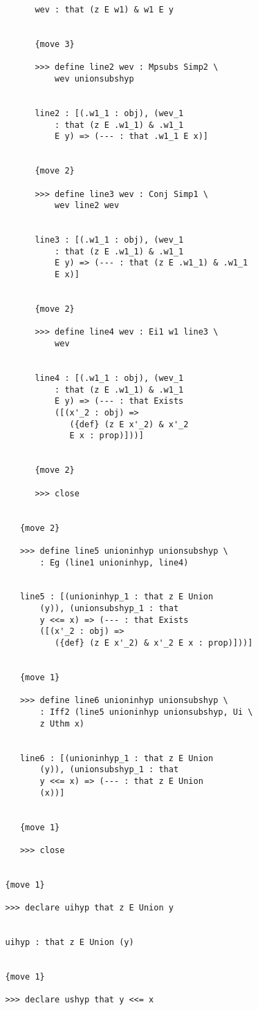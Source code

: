 \documentclass[12pt]{article}
\begin{document}
\begin{verbatim}
         wev : that (z E w1) & w1 E y


         {move 3}

         >>> define line2 wev : Mpsubs Simp2 \
             wev unionsubshyp


         line2 : [(.w1_1 : obj), (wev_1 
             : that (z E .w1_1) & .w1_1 
             E y) => (--- : that .w1_1 E x)]


         {move 2}

         >>> define line3 wev : Conj Simp1 \
             wev line2 wev


         line3 : [(.w1_1 : obj), (wev_1 
             : that (z E .w1_1) & .w1_1 
             E y) => (--- : that (z E .w1_1) & .w1_1 
             E x)]


         {move 2}

         >>> define line4 wev : Ei1 w1 line3 \
             wev


         line4 : [(.w1_1 : obj), (wev_1 
             : that (z E .w1_1) & .w1_1 
             E y) => (--- : that Exists 
             ([(x'_2 : obj) => 
                ({def} (z E x'_2) & x'_2 
                E x : prop)]))]


         {move 2}

         >>> close


      {move 2}

      >>> define line5 unioninhyp unionsubshyp \
          : Eg (line1 unioninhyp, line4)


      line5 : [(unioninhyp_1 : that z E Union 
          (y)), (unionsubshyp_1 : that 
          y <<= x) => (--- : that Exists 
          ([(x'_2 : obj) => 
             ({def} (z E x'_2) & x'_2 E x : prop)]))]


      {move 1}

      >>> define line6 unioninhyp unionsubshyp \
          : Iff2 (line5 unioninhyp unionsubshyp, Ui \
          z Uthm x)


      line6 : [(unioninhyp_1 : that z E Union 
          (y)), (unionsubshyp_1 : that 
          y <<= x) => (--- : that z E Union 
          (x))]


      {move 1}

      >>> close


   {move 1}

   >>> declare uihyp that z E Union y


   uihyp : that z E Union (y)


   {move 1}

   >>> declare ushyp that y <<= x



\end{verbatim}
\end{document}
